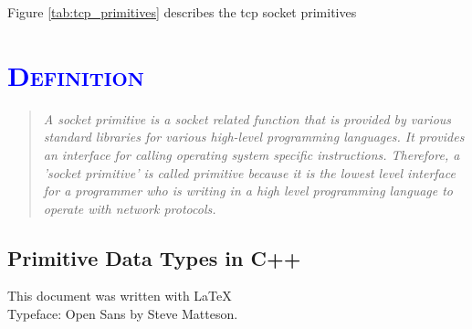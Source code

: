 \documentclass[xcolor=dvipsnames]{article}
\begin{document}
Figure \ref{tab:tcp_primitives} describes the \gls{tcp} socket primitives \cite[p. 142, ch. 4.3.1]{tanenbaum}

\section{\scshape{\textcolor{blue}{Definition}}} \label{definition}

\begin{quote}

\textit{A socket primitive is a socket related function that is provided by various standard libraries for various high-level programming languages. It provides an interface for calling operating system specific instructions. Therefore, a 'socket primitive' is called primitive because it is the lowest level interface for a programmer who is writing in a high level programming language to operate with network protocols.}

\end{quote}

\begin{appendix}

\section{Primitive Data Types in C++}\label{c++_data_types}



\end{appendix}

\printnoidxglossaries

\newpage




\vfill
\begin{center}
This document was written with \LaTeX 
\\Typeface: Open Sans by Steve Matteson.
\end{center}

\end{document}
